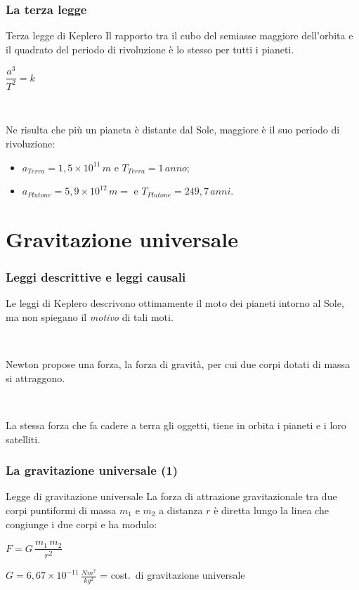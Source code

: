 \documentclass[]{beamer}
\theoremstyle{plain}
\begin{document}
\begin{frame}
\frametitle{La terza legge}
\begin{block}{Terza legge di Keplero}
Il rapporto tra il cubo del semiasse maggiore dell'orbita e il quadrato del periodo di rivoluzione è lo stesso per tutti i pianeti.
\begin{center}
\colorbox{blue!30}{$ \dfrac{a^3}{T^2}=k $}
\end{center}
\end{block}\pause

~

Ne risulta che più un pianeta è distante dal Sole, maggiore è il suo periodo di rivoluzione: 
\begin{itemize}
  \item $ a_{Terra} = 1,5 \times 10^{11} \, m $ e $ T_{Terra} = 1 \, anno $;\pause
  \item $ a_{Plutone} = 5,9 \times 10^{12} \, m = $ e $ T_{Plutone} = 249,7 \, anni $.
\end{itemize}
\begin{center}
\href{gif/keplero3.gif}{}
\end{center}
\end{frame}





\section{Gravitazione universale}






\begin{frame}
\frametitle{Leggi descrittive e leggi causali}
Le leggi di Keplero descrivono ottimamente il moto dei pianeti intorno al Sole, ma non spiegano il \emph{motivo} di tali moti.\pause

~

Newton propose una forza, la \alert{forza di gravità}, per cui due corpi dotati di massa si attraggono.\pause

~

La stessa forza che fa cadere a terra gli oggetti, tiene in orbita i pianeti e i loro satelliti.
\end{frame}



\begin{frame}
\frametitle{La gravitazione universale (1)}
\begin{block}{Legge di gravitazione universale}
La forza di attrazione gravitazionale tra due corpi puntiformi di massa $ m_1 $ e $ m_2 $ a distanza $ r $ è diretta lungo la linea che congiunge i due corpi e ha modulo:
\begin{center}
\colorbox{blue!30}{$ F = G \,  \dfrac{m_1 \, m_2}{r^2} $}
\end{center}
$ G = 6,67 \times 10^{-11} \, \frac{Nm^2}{kg^2}$ =  cost.~di gravitazione universale
\end{block}
\end{frame}
\end{document}
